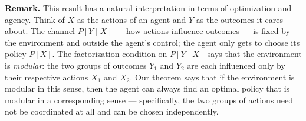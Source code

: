 \documentclass[11pt]{article}
\begin{document}
\begin{exercise}
\medskip
\noindent
\textbf{Remark.} This result has a natural interpretation in terms of optimization and agency. Think of $X$ as the actions of an agent and $Y$ as the outcomes it cares about. The channel $P[Y \mid X]$ — how actions influence outcomes — is fixed by the environment and outside the agent's control; the agent only gets to choose its policy $P[X]$. The factorization condition on $P[Y \mid X]$ says that the environment is \emph{modular}: the two groups of outcomes $Y_1$ and $Y_2$ are each influenced only by their respective actions $X_1$ and $X_2$. Our theorem says that if the environment is modular in this sense, then the agent can always find an optimal policy that is modular in a corresponding sense --- specifically, the two groups of actions need not be coordinated at all and can be chosen independently.
\end{exercise}
\end{document}
